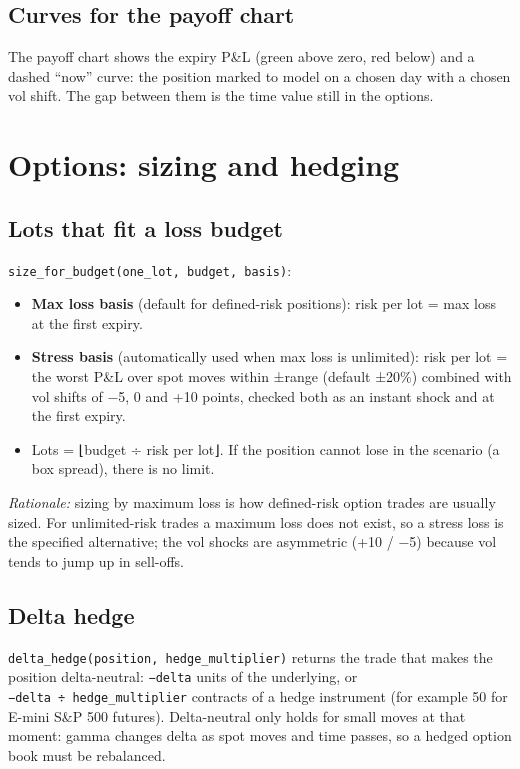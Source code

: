 \documentclass[10pt,a4paper]{article}
\providecommand{\tightlist}{\setlength{\itemsep}{1pt}\setlength{\parskip}{0pt}}
\numberwithin{equation}{section}
\begin{document}
\subsection{Curves for the payoff chart}\label{curves-for-the-payoff-chart}

The payoff chart shows the expiry P\&L (green above zero, red below) and a dashed ``now'' curve: the position marked to model on a chosen day with a chosen vol shift. The gap between them is the time value still in the options.

\section{Options: sizing and hedging}\label{options-sizing-and-hedging}

\subsection{Lots that fit a loss budget}\label{lots-that-fit-a-loss-budget}

\texttt{size\_for\_budget(one\_lot,\ budget,\ basis)}:

\begin{itemize}
\tightlist
\item
  \textbf{Max loss basis} (default for defined-risk positions): risk per lot = \textbar max loss at the first expiry\textbar.
\item
  \textbf{Stress basis} (automatically used when max loss is unlimited): risk per lot = the worst P\&L over spot moves within ±range (default ±20\%) combined with vol shifts of −5, 0 and +10 points, checked both as an instant shock and at the first expiry.
\item
  Lots = ⌊budget ÷ risk per lot⌋. If the position cannot lose in the scenario (a box spread), there is no limit.
\end{itemize}

\emph{Rationale:} sizing by maximum loss is how defined-risk option trades are usually sized. For unlimited-risk trades a maximum loss does not exist, so a stress loss is the specified alternative; the vol shocks are asymmetric (+10 / −5) because vol tends to jump up in sell-offs.

\subsection{Delta hedge}\label{delta-hedge}

\texttt{delta\_hedge(position,\ hedge\_multiplier)} returns the trade that makes the position delta-neutral: \texttt{−delta} units of the underlying, or \texttt{−delta\ ÷\ hedge\_multiplier} contracts of a hedge instrument (for example 50 for E-mini S\&P 500 futures). Delta-neutral only holds for small moves at that moment: gamma changes delta as spot moves and time passes, so a hedged option book must be rebalanced.
\end{document}
